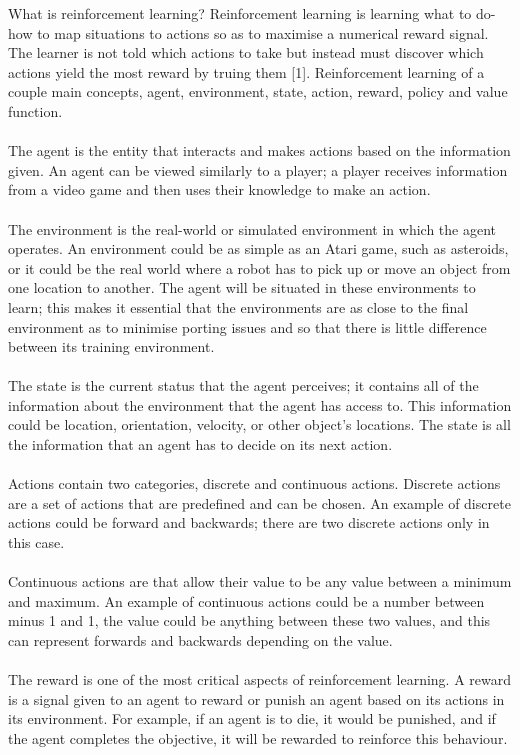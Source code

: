 \documentclass[12pt]{article}
\begin{document}
What is reinforcement learning? Reinforcement learning is learning what to do-how to map situations to actions so as to maximise a numerical reward signal. The learner is not told which actions to take but instead must discover which actions yield the most reward by truing them [1]. Reinforcement learning of a couple main concepts, agent, environment, state, action, reward, policy and value function.
\\\\
The agent is the entity that interacts and makes actions based on the information given. An agent can be viewed similarly to a player; a player receives information from a video game and then uses their knowledge to make an action.
\\\\
The environment is the real-world or simulated environment in which the agent operates. An environment could be as simple as an Atari game, such as asteroids, or it could be the real world where a robot has to pick up or move an object from one location to another. The agent will be situated in these environments to learn; this makes it essential that the environments are as close to the final environment as to minimise porting issues and so that there is little difference between its training environment.
\\\\
The state is the current status that the agent perceives; it contains all of the information about the environment that the agent has access to. This information could be location, orientation, velocity, or other object's locations. The state is all the information that an agent has to decide on its next action.
\\\\
Actions contain two categories, discrete and continuous actions. Discrete actions are a set of actions that are predefined and can be chosen. An example of discrete actions could be forward and backwards; there are two discrete actions only in this case.
\\\\
Continuous actions are that allow their value to be any value between a minimum and maximum. An example of continuous actions could be a number between minus 1 and 1, the value could be anything between these two values, and this can represent forwards and backwards depending on the value.
\\\\
The reward is one of the most critical aspects of reinforcement learning. A reward is a signal given to an agent to reward or punish an agent based on its actions in its environment. For example, if an agent is to die, it would be punished, and if the agent completes the objective, it will be rewarded to reinforce this behaviour.
\end{document}
